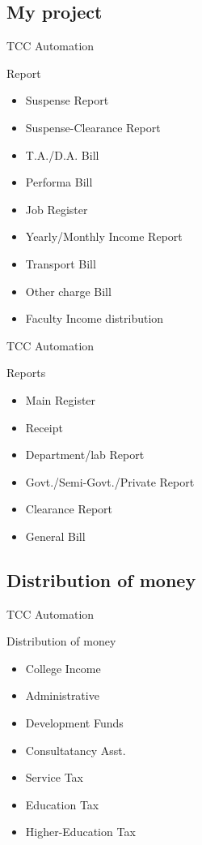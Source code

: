 \subsection{My project}
\begin{frame}{TCC Automation}
\begin{block}{Report}
\begin{itemize}
\item<2->Suspense Report
\item<3->Suspense-Clearance Report
\item<4->T.A./D.A. Bill
\item<5->Performa Bill
\item<6->Job Register
\item<7->Yearly/Monthly Income Report
\item<8->Transport Bill
\item<9->Other charge Bill
\item<10->Faculty Income distribution
\end{itemize}
\end{block}
\end{frame}
\newpage
\begin{frame}{TCC Automation}
\begin{block}{Reports}
\begin{itemize}
\item<2->Main Register
\item<3->Receipt
\item<4->Department/lab Report
\item<5->Govt./Semi-Govt./Private Report
\item<6->Clearance Report
\item<7->General Bill
\end{itemize}
\end{block}
\end{frame}
\newpage
\subsection{Distribution of money}
\begin{frame}{TCC Automation}
\begin{block}{Distribution of money}
\begin{itemize}
\item<2->College Income
\item<3->Administrative
\item<4->Development Funds
\item<5->Consultatancy Asst.
\item<6->Service Tax
\item<7->Education Tax
\item<8->Higher-Education Tax
\end{itemize}
\end{block}
\end{frame}

